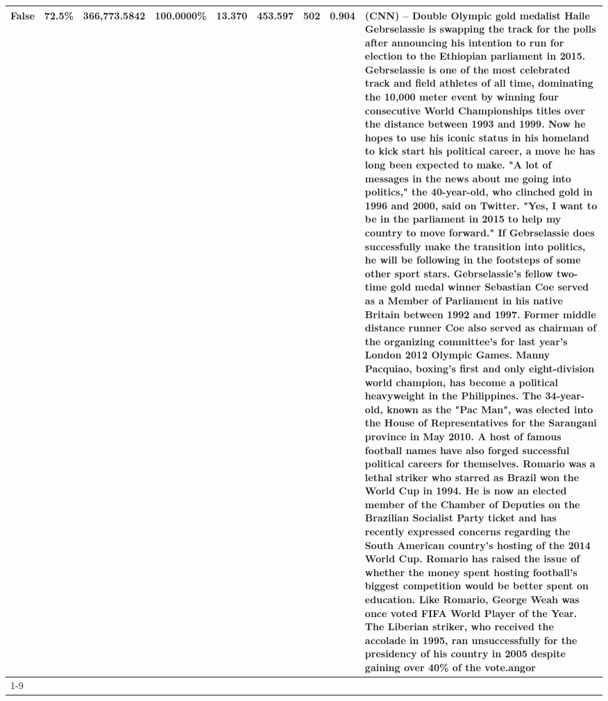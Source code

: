 \begin{table}[H]
{\begin{tabular}{lllrlllll}
False & 72.5\% & 366,773.5842 & \bfseries \color{red} 100.0000\% & 13.370 & 453.597 & 502 & 0.904 & (CNN) -- Double Olympic gold medalist Haile Gebrselassie is swapping the track for the polls after announcing his intention to run for election to the Ethiopian parliament in 2015. Gebrselassie is one of the most celebrated track and field athletes of all time, dominating the 10,000 meter event by winning four consecutive World Championships titles over the distance between 1993 and 1999. Now he hopes to use his iconic status in his homeland to kick start his political career, a move he has long been expected to make. "A lot of messages in the news about me going into politics," the 40-year-old, who clinched gold in 1996 and 2000, said on Twitter. "Yes, I want to be in the parliament in 2015 to help my country to move forward." If Gebrselassie does successfully make the transition into politics, he will be following in the footsteps of some other sport stars. Gebrselassie's fellow two-time gold medal winner Sebastian Coe served as a Member of Parliament in his native Britain between 1992 and 1997. Former middle distance runner Coe also served as chairman of the organizing committee's for last year's London 2012 Olympic Games. Manny Pacquiao, boxing's first and only eight-division world champion, has become a political heavyweight in the Philippines. The 34-year-old, known as the "Pac Man", was elected into the House of Representatives for the Sarangani province in May 2010. A host of famous football names have also forged successful political careers for themselves. Romario was a lethal striker who starred as Brazil won the World Cup in 1994. He is now an elected member of the Chamber of Deputies on the Brazilian Socialist Party ticket and has recently expressed concerns regarding the South American country's hosting of the 2014 World Cup. Romario has raised the issue of whether the money spent hosting football's biggest competition would be better spent on education. Like Romario, George Weah was once voted FIFA World Player of the Year. The Liberian striker, who received the accolade in 1995, ran unsuccessfully for the presidency of his country in 2005 despite gaining over 40\% of the vote.angor \\
\cline{1-9}

\end{tabular}}
\end{table}

